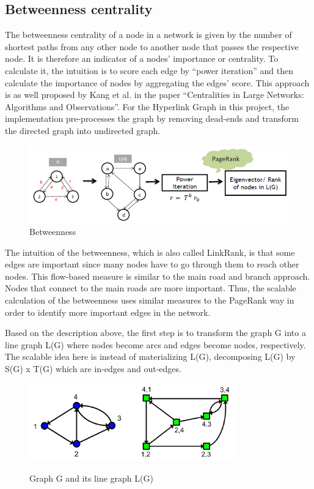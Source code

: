 \subsection{Betweenness centrality}
The betweenness centrality of a node in a network is given by the number of shortest paths from any other node to another node that passes the respective node. It is therefore an indicator of a nodes’ importance or centrality. To calculate it, the intuition is to score each edge by “power iteration” and then calculate the importance of nodes by aggregating the edges’ score. This approach is as well proposed by Kang et al. in the paper “Centralities in Large Networks: Algorithms and Observations”. For the Hyperlink Graph in this project, the implementation pre-processes the graph by removing dead-ends and transform the directed graph into undirected graph.

\begin{figure}[H]
	\begin{center}
		\caption{Betweenness}		
		\label{fig5}		
		\includegraphics[width=1.0\textwidth]{fig5}	
	\end{center}
\end{figure}

The intuition of the betweenness, which is also called LinkRank, is that some edges are important since many nodes have to go through them to reach other nodes. This flow-based measure is similar to the main road and branch approach. Nodes that connect to the main roads are more important. Thus, the scalable calculation of the betweenness uses similar measures to the PageRank way in order to identify more important edges in the network.

Based on the description above, the first step is to transform the graph G into a line graph L(G) where nodes become arcs and edges become nodes, respectively. The scalable idea here is instead of materializing L(G), decomposing L(G) by S(G) x T(G) which are in-edges and out-edges. 

\begin{figure}[H]
	\begin{center}
		\label{fig6}		
		\includegraphics[width=0.8\textwidth]{fig6}	
		\caption{Graph G and its line graph L(G)}	
	\end{center}
\end{figure}

